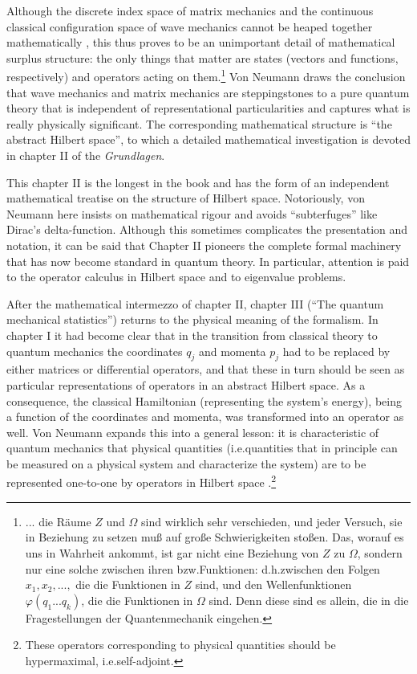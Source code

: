 \documentclass[12pt]{article}
\begin{document}
Although the discrete index space of matrix mechanics and the continuous classical configuration space of wave mechanics cannot be heaped together mathematically \cite[p.\@ 15]{VN1}, this thus proves to be an unimportant detail of mathematical surplus structure: the only things that matter are states (vectors and functions, respectively) and operators acting on them.\footnote{... die R\"{a}ume $Z$ und $\Omega$ sind wirklich sehr verschieden, und jeder Versuch, sie in Beziehung zu setzen mu{\ss} auf gro{\ss}e Schwierigkeiten sto{\ss}en. Das, worauf es uns in Wahrheit ankommt, ist gar nicht eine Beziehung von $Z$ zu $\Omega$, sondern nur eine solche zwischen ihren bzw.\@ Funktionen: d.h.\@ zwischen den Folgen $x_1, x_2, ..., $ die die Funktionen in $Z$ sind, und den Wellenfunktionen $\varphi(q_1... q_k)$, die die Funktionen in $\Omega$ sind. Denn diese sind es allein, die in die Fragestellungen der Quantenmechanik eingehen.}
Von Neumann draws the conclusion that wave mechanics and matrix mechanics are steppingstones to a pure quantum theory that is independent of  representational particularities and captures what is really physically significant. The corresponding mathematical structure is ``the abstract Hilbert space'', to which a detailed mathematical investigation is devoted in chapter II of the \emph{Grundlagen}.

This chapter II is the longest in the book and has the form of an independent mathematical treatise on the structure of Hilbert space. Notoriously, von Neumann here insists on mathematical rigour and avoids ``subterfuges'' like Dirac's delta-function. Although this sometimes complicates the presentation and notation, it can be said that Chapter II pioneers the complete formal machinery that has now become standard in quantum theory. In particular, attention is paid to the operator calculus in Hilbert space and to eigenvalue problems.

After the mathematical intermezzo of chapter II, chapter III (``The quantum mechanical statistics'') returns to the physical meaning of the formalism. In chapter I it had become clear that in the transition from classical theory to quantum mechanics the coordinates $q_j$ and momenta $p_j$ had to be replaced by either matrices or differential operators, and that these in turn should be seen as particular representations of  operators in an abstract Hilbert space. As a consequence, the classical Hamiltonian (representing the system's energy), being a function of the coordinates and momenta, was transformed into an operator as well. Von Neumann expands this into a general lesson: it is characteristic of quantum mechanics that physical quantities (i.e.\@ quantities that in principle can be measured on a physical system and characterize the system) are to be represented one-to-one by operators in Hilbert space \cite[sect.\@ III.1 and especially sect.\@ III.5]{VN1}.\footnote{These operators corresponding to physical quantities should be hypermaximal, i.e.\@ self-adjoint.}
\end{document}
